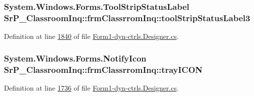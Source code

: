 \hypertarget{class_sr_p___classroom_inq_1_1frm_classrrom_inq_a24d465fc0b54799fb86003278ae1e0c7}{
\subsubsection[{tool\-Strip\-Status\-Label3}]{\setlength{\rightskip}{0pt plus 5cm}\-System.\-Windows.\-Forms.\-Tool\-Strip\-Status\-Label {\bf \-Sr\-P\-\_\-\-Classroom\-Inq\-::frm\-Classrrom\-Inq\-::tool\-Strip\-Status\-Label3}}}
\label{class_sr_p___classroom_inq_1_1frm_classrrom_inq_a24d465fc0b54799fb86003278ae1e0c7}


\-Definition at line \hyperlink{_form1-dyn-ctrls_8_designer_8cs_source_l01840}{1840} of file \hyperlink{_form1-dyn-ctrls_8_designer_8cs_source}{\-Form1-\/dyn-\/ctrls.\-Designer.\-cs}.

\hypertarget{class_sr_p___classroom_inq_1_1frm_classrrom_inq_a8c062d5fe665631b364688c76e36e7f7}{
\subsubsection[{tray\-I\-C\-O\-N}]{\setlength{\rightskip}{0pt plus 5cm}\-System.\-Windows.\-Forms.\-Notify\-Icon {\bf \-Sr\-P\-\_\-\-Classroom\-Inq\-::frm\-Classrrom\-Inq\-::tray\-I\-C\-O\-N}}}
\label{class_sr_p___classroom_inq_1_1frm_classrrom_inq_a8c062d5fe665631b364688c76e36e7f7}


\-Definition at line \hyperlink{_form1-dyn-ctrls_8_designer_8cs_source_l01736}{1736} of file \hyperlink{_form1-dyn-ctrls_8_designer_8cs_source}{\-Form1-\/dyn-\/ctrls.\-Designer.\-cs}.

